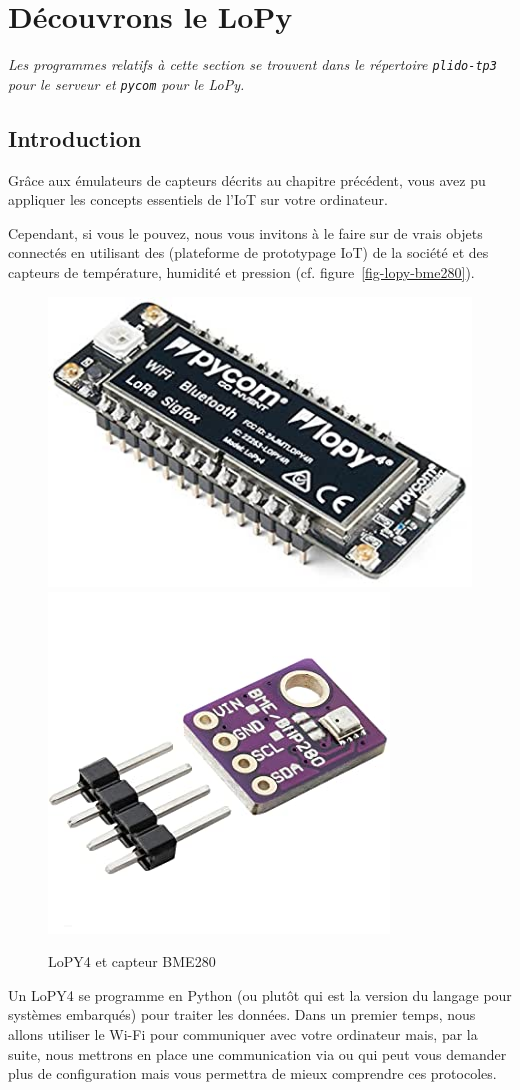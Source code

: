 \chapter{Découvrons le LoPy}

\textit{Les programmes relatifs à cette section se trouvent dans le répertoire \texttt{plido-tp3} pour le serveur et \texttt{pycom} pour le LoPy.}

\section{Introduction}

Grâce aux émulateurs de capteurs décrits au chapitre précédent, vous avez pu appliquer les concepts essentiels de l'IoT sur votre ordinateur.

Cependant, si vous le pouvez, nous vous invitons à le faire sur de vrais objets connectés en utilisant des  (plateforme de prototypage IoT) de la société  et des capteurs de température, humidité et pression  (cf. figure~\vref{fig-lopy-bme280}). 

\begin{figure}[tbp]
\centerline{\includegraphics[width=.5\columnwidth]{Pictures/LoPy.jpg}  \includegraphics[width=.3\columnwidth]{Pictures/BME280.jpeg}}
\caption{LoPY4 et capteur BME280}
\label{fig-lopy-bme280}
\end{figure}

Un LoPY4 se programme en Python (ou plutôt  qui est la version du langage pour systèmes embarqués) pour traiter les données. Dans un premier temps, nous allons utiliser le Wi-Fi pour communiquer avec votre ordinateur mais, par la suite, nous mettrons en place une communication via  ou  qui peut vous demander plus de configuration mais vous permettra de mieux comprendre ces protocoles.

